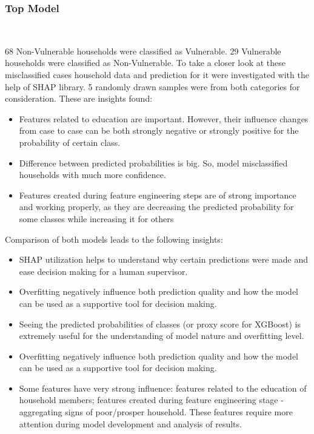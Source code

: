     \subsubsection{Top Model}~~~

    68 Non-Vulnerable households were classified as Vulnerable. 29 Vulnerable households were classified as Non-Vulnerable.
    To take a closer look at these misclassified cases household data and prediction for it were investigated with the help of SHAP library. 5 randomly drawn samples were from both categories for consideration.
    These are insights found:
        \begin{itemize}
            \item Features related to education are important. However, their influence changes from case to case can be both strongly negative or strongly positive for the probability of certain class.
            \item Difference between predicted probabilities is big. So, model misclassified households with much more confidence.
            \item Features created during feature engineering steps are of strong importance and working properly, as they are decreasing the predicted probability for some classes while increasing it for others
        \end{itemize}
        
        Comparison of both models leads to the following insights:
        \begin{itemize}
            \item SHAP utilization helps to understand why certain predictions were made and ease decision making for a human supervisor.
            \item Overfitting negatively influence both prediction quality and how the model can be used as a supportive tool for decision making.
            \item Seeing the predicted probabilities of classes (or proxy score for XGBoost) is extremely useful for the understanding of model nature and overfitting level.
            \item Overfitting negatively influence both prediction quality and how the model can be used as a supportive tool for decision making.
            \item Some features have very strong influence: features related to the education of household members; features created during feature engineering stage - aggregating signs of poor/prosper household. These features require more attention during model development and analysis of results.
        \end{itemize}
        

